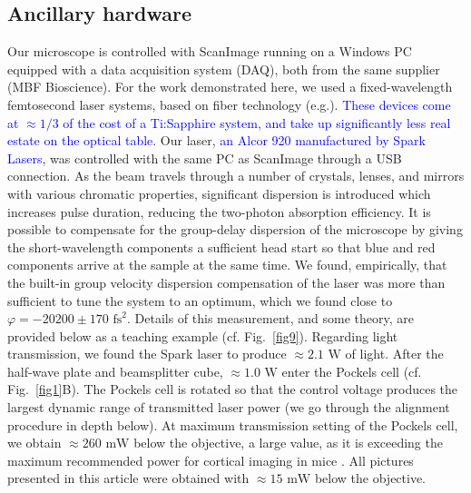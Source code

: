 \documentclass[10pt,letterpaper]{article}
\begin{document}
\subsection*{Ancillary hardware}
Our microscope is controlled with ScanImage \cite{Pologruto2003} running on a Windows PC equipped with a data acquisition system (DAQ), both from the same supplier (MBF Bioscience). For the work demonstrated here, we used a fixed-wavelength femtosecond laser systems, based on fiber technology (e.g.\cite{Bueno2019,Limpert2006,Wise2012,Young2015}). \textcolor{blue}{These devices come at $\approx 1/3$ of the cost of a Ti:Sapphire system, and take up significantly less real estate on the optical table.} Our laser, \textcolor{blue}{an Alcor 920 manufactured by Spark Lasers}, was controlled with the same PC as ScanImage through a USB connection. As the beam travels through a number of crystals, lenses, and mirrors with various chromatic properties, significant dispersion is introduced which increases pulse duration, reducing the two-photon absorption efficiency. It is possible to compensate for the group-delay dispersion of the microscope by giving the short-wavelength components a sufficient head start so that blue and red components arrive at the sample at the same time. We found, empirically, that the built-in group velocity dispersion compensation of the laser was more than sufficient to tune the system to an optimum, which we found close to $\varphi=-20200\pm170\text{ fs}^2$. Details of this measurement, and some theory, are provided below as a teaching example (cf. Fig.~\ref{fig9}). Regarding light transmission, we found the Spark laser to produce $\approx 2.1\text{ W}$ of light. After the half-wave plate and beamsplitter cube, $\approx 1.0\text{ W}$ enter the Pockels cell (cf. Fig.~\ref{fig1}B). The Pockels cell is rotated so that the control voltage produces the largest dynamic range of transmitted laser power (we go through the alignment procedure in depth below). At maximum transmission setting of the Pockels cell, we obtain $\approx 260\text{ mW}$ below the objective, a large value, as it is exceeding the maximum recommended power for cortical imaging in mice \cite{Song2017}. All pictures presented in this article were obtained with $\approx 15\text{ mW}$ below the objective.
\end{document}
